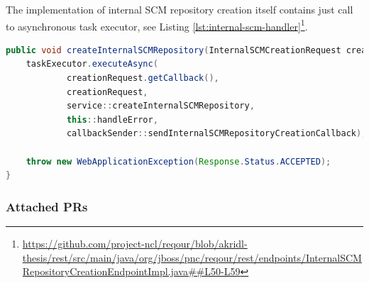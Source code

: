 \documentclass[../main.tex]{subfiles}
\begin{document}
The implementation of internal SCM repository creation itself contains just call to asynchronous task executor, see Listing \ref{lst:internal-scm-handler}\footnote{\url{https://github.com/project-ncl/reqour/blob/akridl-thesis/rest/src/main/java/org/jboss/pnc/reqour/rest/endpoints/InternalSCMRepositoryCreationEndpointImpl.java##L50-L59}}.

\begin{lstlisting}[language=Java, caption=Internal SCM repository creation endpoint handler, label={lst:internal-scm-handler}]
public void createInternalSCMRepository(InternalSCMCreationRequest creationRequest) {
    taskExecutor.executeAsync(
            creationRequest.getCallback(),
            creationRequest,
            service::createInternalSCMRepository,
            this::handleError,
            callbackSender::sendInternalSCMRepositoryCreationCallback);

    throw new WebApplicationException(Response.Status.ACCEPTED);
}
\end{lstlisting}

\subsubsection*{Attached PRs}

\end{document}

